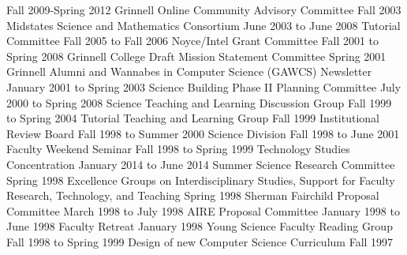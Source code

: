 \begin{cventries}
  {Fall 2009-Spring 2012}
  {Grinnell Online Community Advisory Committee}
  {Fall 2003}
  {Midstates Science and Mathematics Consortium}
  {June 2003 to June 2008}
  {Tutorial Committee}
  {Fall 2005 to Fall 2006}
  {Noyce/Intel Grant Committee}
  {Fall 2001 to Spring 2008}
  {Grinnell College Draft Mission Statement Committee}
  {Spring 2001}
  {Grinnell Alumni and Wannabes in Computer Science (GAWCS) Newsletter}
  {January 2001 to Spring 2003}
  {Science Building Phase II Planning Committee}
  {July 2000 to Spring 2008}
  {Science Teaching and Learning Discussion Group}
  {Fall 1999 to Spring 2004}
  {Tutorial Teaching and Learning Group}
  {Fall 1999}
  {Institutional Review Board}
  {Fall 1998 to Summer 2000}
  {Science Division}
  {Fall 1998 to June 2001}
  {Faculty Weekend Seminar}
  {Fall 1998 to Spring 1999}
  {Technology Studies Concentration}
  {January 2014 to June 2014}
  {Summer Science Research Committee}
  {Spring 1998}
  {Excellence Groups on Interdisciplinary Studies, Support for Faculty Research, Technology, and Teaching}
  {Spring 1998}
  {Sherman Fairchild Proposal Committee}
  {March 1998 to July 1998}
  {AIRE Proposal Committee}
  {January 1998 to June 1998}
  {Faculty Retreat}
  {January 1998}
  {Young Science Faculty Reading Group}
  {Fall 1998 to Spring 1999}
  {Design of new Computer Science Curriculum}
  {Fall 1997}

\end{cventries}
